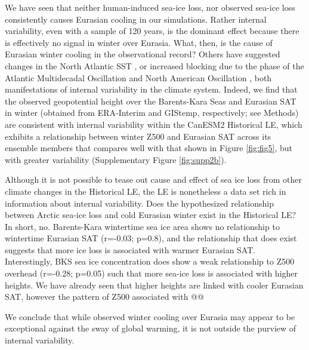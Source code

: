 \documentclass{nature}
\begin{document}
We have seen that neither human-induced sea-ice loss, nor observed sea-ice loss consistently causes Eurasian cooling in our simulations. Rather internal variability, even with a sample of 120 years, is the dominant effect because there is effectively no signal in winter over Eurasia. What, then, is the cause of Eurasian winter cooling in the observational record? Others have suggested changes in the North Atlantic SST \cite{sato14}, or increased blocking due to the phase of the Atlantic Multidecadal Oscillation and North American Oscillation \cite{peings14b}, both manifestations of internal variability in the climate system. Indeed, we find that the observed geopotential height over the Barents-Kara Seas and Eurasian SAT in winter (obtained from ERA-Interim and GIStemp, respectively; see Methods) are consistent with internal variability within the CanESM2 Historical LE, which exhibits a relationship between winter Z500 and Eurasian SAT across its ensemble members that compares well with that shown in Figure \ref{fig:fig5}, but with greater variability (Supplementary Figure \ref{fig:supp2b}).

Although it is not possible to tease out cause and effect of sea ice loss from other climate changes in the Historical LE, the LE is nonetheless a data set rich in information about internal variability. Does the hypothesized relationship between Arctic sea-ice loss and cold Eurasian winter exist in the Historical LE? In short, no. Barents-Kara wintertime sea ice area shows no relationship to wintertime Eurasian SAT (r=-0.03; p=0.8), and the relationship that does exist suggests that more ice loss is associated with warmer Eurasian SAT. Interestingly, BKS sea ice concentration does show a weak relationship to Z500 overhead (r=-0.28; p=0.05) such that more sea-ice loss is associated with higher heights. We have already seen that higher heights are linked with cooler Eurasian SAT, however the pattern of Z500 associated with @@




We conclude that while observed winter cooling over Eurasia may appear to be exceptional against the sway of global warming, it is not outside the purview of internal variability.

\end{document}
